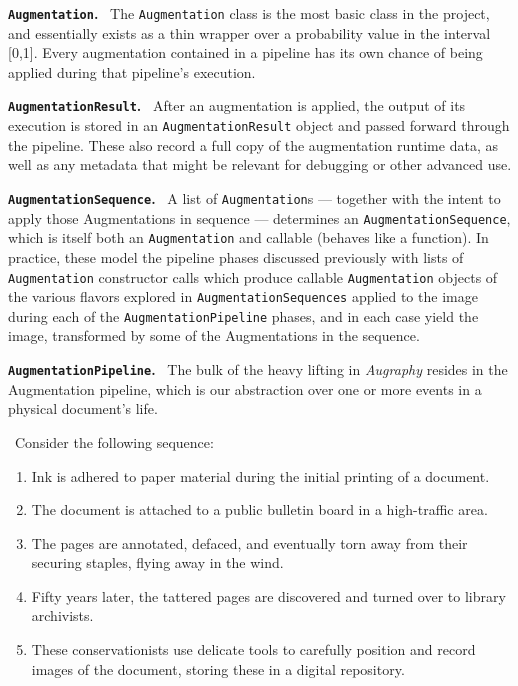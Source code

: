 \documentclass[runningheads]{llncs}
\begin{document}
\smallskip
\noindent\textbf{\texttt{Augmentation}.} ~The \texttt{Augmentation} class is the most basic class in the project, and essentially exists as a thin wrapper over a probability value in the interval [0,1].
Every augmentation contained in a pipeline has its own chance of being applied during that pipeline's execution.

\smallskip
\noindent\textbf{\texttt{AugmentationResult}.} ~After an augmentation is applied, the output of its execution is stored in an \texttt{AugmentationResult} object and passed forward through the pipeline.
These also record a full copy of the augmentation runtime data, as well as any metadata that might be relevant for debugging or other advanced use.

\smallskip
\noindent\textbf{\texttt{AugmentationSequence}.} ~A list of \texttt{Augmentation}s --- together with the intent to apply those Augmentations in sequence --- determines an \texttt{AugmentationSequence}, which is itself both an \texttt{Augmentation} and callable (behaves like a function).
In practice, these model the pipeline phases discussed previously with lists of \texttt{Augmentation} constructor calls which produce callable \texttt{Augmentation} objects of the various flavors explored in \texttt{AugmentationSequences} applied to the image during each of the \texttt{AugmentationPipeline} phases, and in each case yield the image, transformed by some of the Augmentations in the sequence.

\smallskip
\noindent\textbf{\texttt{AugmentationPipeline}.} ~The bulk of the heavy lifting in \emph{Augraphy} resides in the Augmentation pipeline, which is our abstraction over one or more events in a physical document's life.

\smallskip
\noindent~Consider the following sequence:
\begin{enumerate}[leftmargin=4em]
  \item Ink is adhered to paper material during the initial printing of a document.
  \item The document is attached to a public bulletin board in a high-traffic area.
  \item The pages are annotated, defaced, and eventually torn away from their securing staples, flying away in the wind.
  \item Fifty years later, the tattered pages are discovered and turned over to library archivists.
  \item These conservationists use delicate tools to carefully position and record images of the document, storing these in a digital repository.
\end{enumerate}
\end{document}
